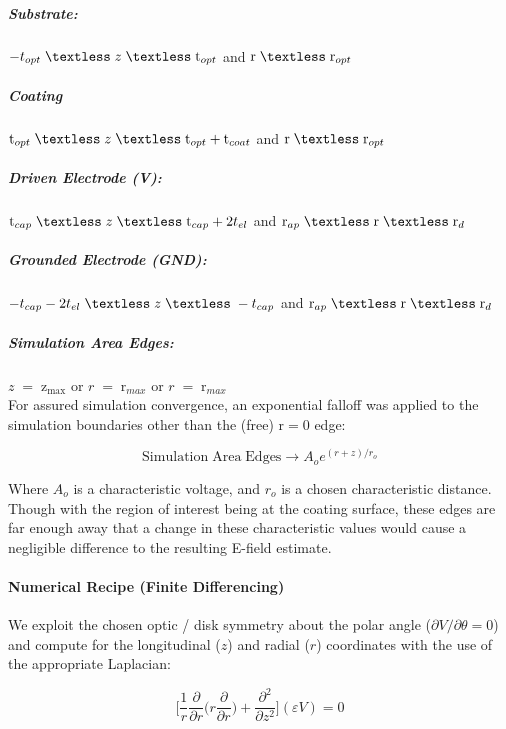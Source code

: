 \subparagraph*{Substrate:}
$ -t_{opt} \; \textless \; z \; \textless \;\mathrm{t}_{opt} $ and $\mathrm{r} \; \textless \;\mathrm{r}_{opt}$
\subparagraph*{Coating}
$\mathrm{t}_{opt} \; \textless \; z \; \textless \;\mathrm{t}_{opt} +\mathrm{t}_{coat} $ and $\mathrm{r} \; \textless \;\mathrm{r}_{opt} $

\subparagraph*{Driven Electrode (V):}
$\mathrm{t}_{cap} \; \textless \; z \; \textless \;\mathrm{t}_{cap} + 2t_{el} $ and $\mathrm{r}_{ap} \; \textless \;\mathrm{r} \; \textless \;\mathrm{r}_{d} $

\subparagraph*{Grounded Electrode (GND):}
$ -t_{cap} -2t_{el} \; \textless \; z \; \textless \; -t_{cap} $ and $\mathrm{r}_{ap} \; \textless \;\mathrm{r} \; \textless \;\mathrm{r}_{d} $

\subparagraph*{Simulation Area Edges:}
$ z \; = \;\mathrm{z}_\mathrm{max} $ or  $r \; = \;\mathrm{r}_{max}$ or  $r \; = \;\mathrm{r}_{max}$ 
\\

\noindent For assured simulation convergence, an exponential falloff was applied to the simulation boundaries other than the (free) $\mathrm{r} = 0$ edge:

\begin{equation}
    \mathrm{Simulation \; Area \; Edges} \rightarrow A_o e^{(r+z)/r_o}
\end{equation}

Where $A_o$ is a characteristic voltage, and $r_o$ is a chosen characteristic distance. Though with the region of interest being at the coating surface, these edges are far enough away that a change in these characteristic values would cause a negligible difference to the resulting E-field estimate.

\paragraph*{Numerical Recipe (Finite Differencing)}

We exploit the chosen optic / disk symmetry about the polar angle ($\partial V / \partial \theta = 0$) and compute for the longitudinal ($z$) and radial ($r$) coordinates with the use of the appropriate Laplacian:

\begin{equation} 
\bigg[\frac{1}{r}\frac{\partial}{\partial r} \bigg( r \frac{\partial}{\partial r}\bigg) + \frac{\partial^2}{\partial z^2} \bigg](\varepsilon V) = 0
\end{equation}

